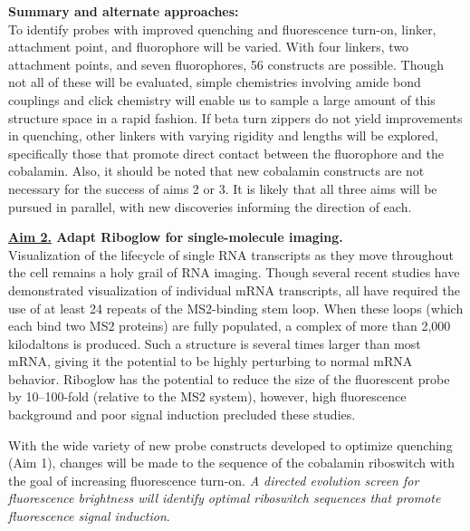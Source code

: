 \textbf{Summary and alternate approaches:}\\
To identify probes with improved quenching and fluorescence turn-on, linker, attachment point, and fluorophore will be varied. With four linkers, two attachment points, and seven fluorophores, 56 constructs are possible. Though not all of these will be evaluated, simple chemistries involving amide bond couplings and click chemistry will enable us to sample a large amount of this structure space in a rapid fashion. If beta turn zippers do not yield improvements in quenching, other linkers with varying rigidity and lengths will be explored\cite{LeeDesignSynthesisCharacterization2009}, specifically those that promote direct contact between the fluorophore and the cobalamin. Also, it should be noted that new cobalamin constructs are not necessary for the success of aims 2 or 3. It is likely that all three aims will be pursued in parallel, with new discoveries informing the direction of each.

\textbf{\underline{Aim 2.} Adapt Riboglow for single-molecule imaging.}\\
Visualization of the lifecycle of single RNA transcripts as they move throughout the cell remains a holy grail of RNA imaging.\cite{LiCentraldogmasinglemolecule2011} Though several recent studies have demonstrated visualization of individual mRNA transcripts, all have required the use of at least 24 repeats of the MS2-binding stem loop\cite{KatzMappingtranslationhotspots2016,FuscoSinglemRNAMolecules2003,YamagishiSinglemoleculeimagingvactin2009,HalsteadRNAbiosensorimaging2015}.
When these loops (which each bind two MS2 proteins) are fully populated, a complex of more than 2,000 kilodaltons is produced.
Such a structure is several times larger than most mRNA, giving it the potential to be highly perturbing to normal mRNA behavior.
Riboglow has the potential to reduce the size of the fluorescent probe by 10--100-fold (relative to the MS2 system), however, high fluorescence background and poor signal induction precluded these studies\cite{BraselmannDevelopmentriboswitchbasedplatform2017}.


With the wide variety of new probe constructs developed to optimize quenching (Aim 1), changes will be made to the sequence of the cobalamin riboswitch with the goal of increasing fluorescence turn-on. \textit{A directed evolution screen for fluorescence brightness will identify optimal riboswitch sequences that promote fluorescence signal induction}.


